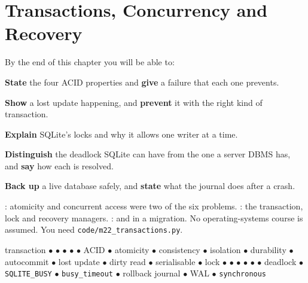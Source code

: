 \chapter{Transactions, Concurrency and Recovery}\label{ch:transactions}

\begin{outcomes}
By the end of this chapter you will be able to:
\begin{tight}
  \item \textbf{State} the four ACID properties and \textbf{give} a failure
        that each one prevents.
  \item \textbf{Show} a lost update happening, and \textbf{prevent} it with
        the right kind of transaction.
  \item \textbf{Explain} SQLite's locks and why it allows one writer at a time.
  \item \textbf{Distinguish} the deadlock SQLite can have from the one a server
        DBMS has, and \textbf{say} how each is resolved.
  \item \textbf{Back up} a live database safely, and \textbf{state} what the
        journal does after a crash.
\end{tight}
\end{outcomes}

\begin{prereq}
: atomicity and concurrent access were two of the six
problems. : the transaction, lock and recovery managers.
:  and  in a migration. No
operating-systems course is assumed. You need
\texttt{code/m22\_transactions.py}.
\end{prereq}

\begin{keyterms}
transaction $\bullet$  $\bullet$  $\bullet$
 $\bullet$  $\bullet$ ACID $\bullet$
atomicity $\bullet$ consistency $\bullet$ isolation $\bullet$ durability
$\bullet$ autocommit $\bullet$ lost update $\bullet$ dirty read $\bullet$
serialisable $\bullet$ lock $\bullet$  $\bullet$
 $\bullet$  $\bullet$ 
$\bullet$  $\bullet$ deadlock $\bullet$ \texttt{SQLITE\_BUSY}
$\bullet$ \texttt{busy\_timeout} $\bullet$ rollback journal $\bullet$ WAL
$\bullet$ \texttt{synchronous}
\end{keyterms}

